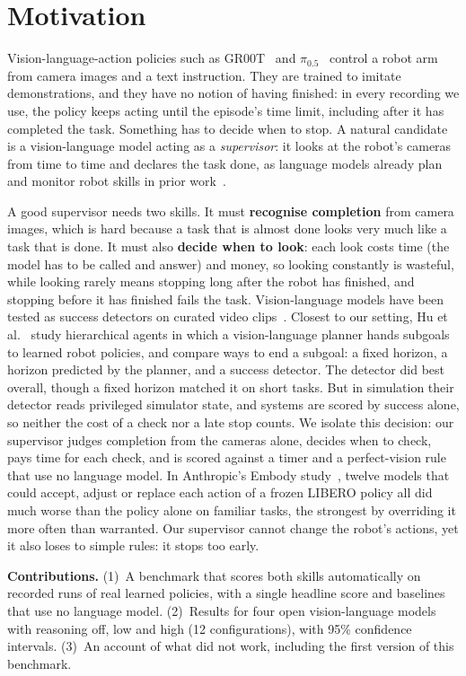 \documentclass[10pt,twocolumn,letterpaper]{article}
\begin{document}
\section{Motivation}
Vision-language-action policies such as GR00T~\cite{gr00t} and $\pi_{0.5}$~\cite{pi05} control a robot arm from
camera images and a text instruction. They are trained to imitate demonstrations, and they have no notion of having
finished: in every recording we use, the policy keeps acting until the episode's time limit, including after it has
completed the task. Something has to decide when to stop. A natural candidate is a vision-language model acting as a
\emph{supervisor}: it looks at the robot's cameras from time to time and declares the task done, as language models
already plan and monitor robot skills in prior work~\cite{saycan,innermonologue}.

A good supervisor needs two skills. It must \textbf{recognise completion} from camera images, which is hard because a
task that is almost done looks very much like a task that is done. It must also \textbf{decide when to look}: each
look costs time (the model has to be called and answer) and money, so looking constantly is wasteful, while looking
rarely means stopping long after the robot has finished, and stopping before it has finished fails the task.
Vision-language models have been tested as success detectors on curated video clips~\cite{successdetectors}.
Closest to our setting, Hu et al.~\cite{whatmatters} study hierarchical agents in which a vision-language planner
hands subgoals to learned robot policies, and compare ways to end a subgoal: a fixed horizon, a horizon predicted by
the planner, and a success detector. The detector did best overall, though a fixed horizon matched it on short tasks.
But in simulation their detector reads privileged simulator state, and systems are scored by success alone, so neither the cost of a check nor a late stop counts. We isolate this decision: our
supervisor judges completion from the cameras alone, decides when to check, pays time for each check, and is scored
against a timer and a perfect-vision rule that use no language model.
In Anthropic's Embody study~\cite{embody}, twelve models that could accept, adjust or replace each action of a
frozen LIBERO policy all did much worse than the policy alone on familiar tasks, the strongest by overriding
it more often than warranted. Our supervisor cannot change the robot's actions, yet it also loses to simple rules: it
stops too early.

\textbf{Contributions.} (1)~A benchmark that scores both skills automatically on recorded runs of real learned
policies, with a single headline score and baselines that use no language model. (2)~Results for four open
vision-language models with reasoning off, low and high (12 configurations), with 95\% confidence intervals. (3)~An
account of what did not work, including the first version of this benchmark.
\end{document}
